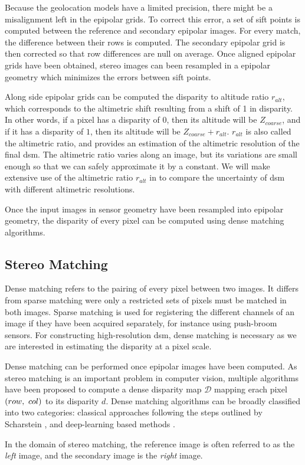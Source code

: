 Because the geolocation models have a limited precision, there might be a misalignment left in the epipolar grids. To correct this error, a set of \acrfull{sift} points \cite{lowe_distinctive_2004} is computed between the reference and secondary epipolar images. For every match, the difference between their rows is computed. The secondary epipolar grid is then corrected so that row differences are null on average. Once aligned epipolar grids have been obtained, stereo images can been resampled in a epipolar geometry which minimizes the errors between \acrshort{sift} points.

Along side epipolar grids can be computed the disparity to altitude ratio $r_{alt}$, which corresponds to the altimetric shift resulting from a shift of 1 in disparity. In other words, if a pixel has a disparity of $0$, then its altitude will be $Z_{coarse}$, and if it has a disparity of $1$, then its altitude will be $Z_{coarse}+r_{alt}$. $r_{alt}$ is also called the altimetric ratio, and provides an estimation of the altimetric resolution of the final \acrshort{dsm}. The altimetric ratio varies along an image, but its variations are small enough so that we can safely approximate it by a constant. We will make extensive use of the altimetric ratio $r_{alt}$ in  to compare the uncertainty of \acrshort{dsm} with different altimetric resolutions.

Once the input images in sensor geometry have been resampled into epipolar geometry, the disparity of every pixel can be computed using dense matching algorithms.

\subsection{Stereo Matching}\label{sec:stereo_matching}
Dense matching refers to the pairing of every pixel between two images. It differs from sparse matching were only a restricted sets of pixels must be matched in both images. Sparse matching is used for registering the different channels of an image if they have been acquired separately, for instance using push-broom sensors. For constructing high-resolution \acrshort{dsm}, dense matching is necessary as we are interested in estimating the disparity at a pixel scale.

Dense matching can be performed once epipolar images have been computed. As stereo matching is an important problem in computer vision, multiple algorithms have been proposed to compute a dense disparity map $\mathcal{D}$ mapping erach pixel $(row, ~col)$ to its disparity $d$. Dense matching algorithms can be broadly classified into two categories: classical approaches following the steps outlined by Scharstein \etal \cite{scharstein_taxonomy_2001}, and deep-learning based methods \cite{laga_survey_2022}.
\begin{remark}
	In the domain of stereo matching, the reference image is often referred to as the \textit{left} image, and the secondary image is the \textit{right} image.
\end{remark}

